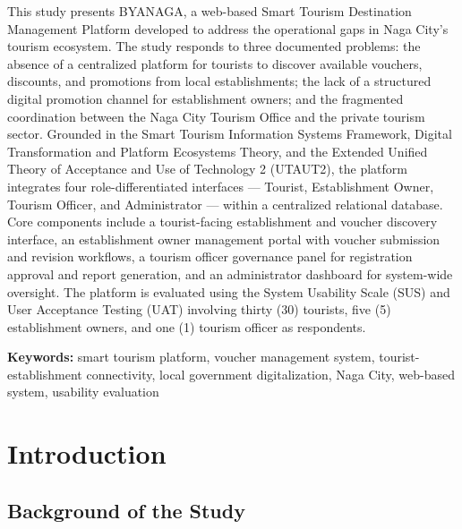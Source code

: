 \documentclass{research}
\begin{document}
This study presents BYANAGA, a web-based Smart Tourism Destination Management Platform developed to address the operational gaps in Naga City's tourism ecosystem. The study responds to three documented problems: the absence of a centralized platform for tourists to discover available vouchers, discounts, and promotions from local establishments; the lack of a structured digital promotion channel for establishment owners; and the fragmented coordination between the Naga City Tourism Office and the private tourism sector. Grounded in the Smart Tourism Information Systems Framework, Digital Transformation and Platform Ecosystems Theory, and the Extended Unified Theory of Acceptance and Use of Technology 2 (UTAUT2), the platform integrates four role-differentiated interfaces — Tourist, Establishment Owner, Tourism Officer, and Administrator — within a centralized relational database. Core components include a tourist-facing establishment and voucher discovery interface, an establishment owner management portal with voucher submission and revision workflows, a tourism officer governance panel for registration approval and report generation, and an administrator dashboard for system-wide oversight. The platform is evaluated using the System Usability Scale (SUS) and User Acceptance Testing (UAT) involving thirty (30) tourists, five (5) establishment owners, and one (1) tourism officer as respondents.

\noindent\textbf{Keywords:} smart tourism platform, voucher management system, tourist-establishment connectivity, local government digitalization, Naga City, web-based system, usability evaluation 

\clearpage
\tableofcontents
\clearpage
\listoffigures
\clearpage
\listoftables
\clearpage
{}

\chapter{Introduction}

\section{Background of the Study}
\end{document}
